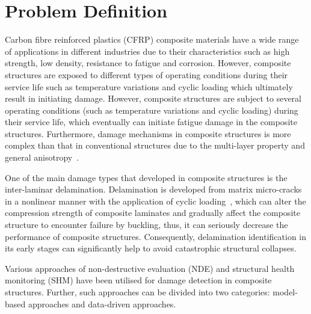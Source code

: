 \section{Problem Definition}
\label{sec11}
Carbon fibre reinforced plastics (CFRP) composite materials have a wide range of applications in different industries due to their characteristics such as high strength, low density, resistance to fatigue and corrosion.
However, composite structures are exposed to different types of operating conditions during their service life such as temperature variations and cyclic loading which ultimately result in initiating damage. 
However, composite structures are subject to several operating conditions (such as temperature variations and cyclic loading) during their service life, which eventually can initiate fatigue damage in the composite structures.
Furthermore, damage mechanisms in composite structures is more complex than that in conventional structures due to the multi-layer property and general anisotropy~\cite{Wu2021}. 

One of the main damage types that developed in composite structures is the inter-laminar delamination.
Delamination is developed from matrix micro-cracks in a nonlinear manner with the application of cyclic loading~\cite{Reifsnider1983, Wu2021}, which can alter the compression strength of composite laminates and gradually affect the composite structure to encounter failure by buckling, thus, it can seriously decrease the performance of composite structures.
Consequently, delamination identification in its early stages can significantly help to avoid catastrophic structural collapses.

Various approaches of non-destructive evaluation (NDE) and structural health monitoring (SHM) have been utilised for damage detection in composite structures. 
Further, such approaches can be divided into two categories: model-based approaches and data-driven approaches.

